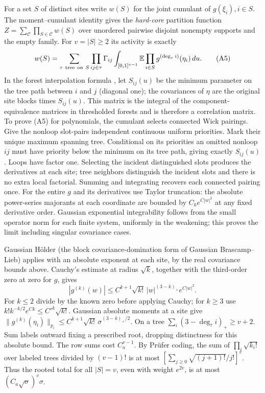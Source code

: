 For a set $S$ of distinct sites write $w(S)$ for the joint cumulant of $g(\xi_i),i\in S$. The moment--cumulant identity gives the \emph{hard-core} partition function $Z=\sum_{\mathcal C}\prod_{S\in\mathcal C}w(S)$ over unordered pairwise disjoint nonempty supports and the empty family. For $v=|S|\ge2$ its activity is exactly
\[
 w(S)=\sum_{\tau\ {\rm tree\ on}\ S}\prod_{ij\in\tau}\Gamma_{ij}
 \int_{[0,1]^{v-1}}\mathbb E\prod_{i\in S} g^{(\deg_\tau i)}(\eta_i)\,du .
 \tag{A5}
\]
In the forest interpolation formula \cite{AR}, let $S_{ij}(u)$ be the minimum parameter on the tree path between $i$ and $j$ (diagonal one); the covariances of $\eta$ are the original site blocks times $S_{ij}(u)$. This matrix is the integral of the component-equivalence matrices in thresholded forests and is therefore a correlation matrix. To prove (A5) for polynomials, the cumulant selects connected Wick pairings. Give the nonloop slot-pairs independent continuous uniform priorities. Mark their unique maximum spanning tree. Conditional on its priorities an omitted nonloop $ij$ must have priority below the minimum on its tree path, giving exactly $S_{ij}(u)$. Loops have factor one. Selecting the incident distinguished slots produces the derivatives at each site; tree neighbors distinguish the incident slots and there is no extra local factorial. Summing and integrating recovers each connected pairing once. For the entire $g$ and its derivatives use Taylor truncation: the absolute power-series majorants at each coordinate are bounded by $C_k e^{C|w|^2}$ at any fixed derivative order. Gaussian exponential integrability follows from the small operator norm for each finite system, uniformly in the weakening; this proves the limit including singular covariance cases.

Gaussian H\"older \cite[Thm.~1]{CDP} (the block covariance-domination form of Gaussian Brascamp--Lieb) applies with an absolute exponent at each site, by the real covariance bounds above. Cauchy's estimate at radius $\sqrt{k}$, together with the third-order zero at zero for $g$, gives
\[
 |g^{(k)}(w)|\le C^{k+1}\sqrt{k!}\,|w|^{(3-k)_+}e^{C|w|^2}.
\]
For $k\le2$ divide by the known zero before applying Cauchy; for $k\ge3$ use $k!k^{-k/2}e^{Ck}\le C'^k\sqrt{k!}$. Gaussian absolute moments at a site give $\|g^{(k)}(\eta_i)\|_{p_i}\le C^{k+1}\sqrt{k!}\,\sigma^{(3-k)_+/2}$. On a tree $\sum_i(3-\deg_\tau i)_+\ge v+2$. Sum labels outward fixing a prescribed root, dropping distinctness for this absolute bound. The row sums cost $C_a^{v-1}$. By Pr\"ufer coding, the sum of $\prod_i\sqrt{k_i!}$ over labeled trees divided by $(v-1)!$ is at most $[\sum_{j\ge0}\sqrt{(j+1)!}/j!]^v$. Thus the rooted total for all $|S|=v$, even with weight $e^{2v}$, is at most $(C_a\sqrt{\sigma})^v\sigma$.

